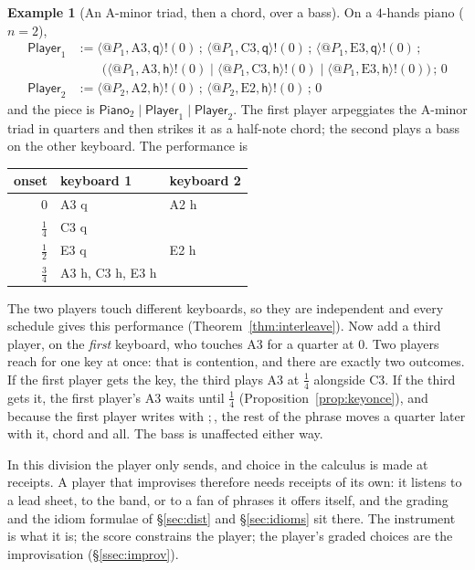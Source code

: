 \documentclass[11pt,a4paper]{article}
\theoremstyle{plain}
\theoremstyle{definition}
\newtheorem{example}[theorem]{Example}
\theoremstyle{remark}
\begin{document}
\begin{example}[An A-minor triad, then a chord, over a bass]\label{ex:piano}
On a $4$-hands piano ($n=2$),
\begin{align*}
\mathsf{Player}_1 &:= \langle @P_1,\mathrm{A3},\mathsf{q}\rangle!(0)\,;\,
  \langle @P_1,\mathrm{C3},\mathsf{q}\rangle!(0)\,;\,
  \langle @P_1,\mathrm{E3},\mathsf{q}\rangle!(0)\,; \\
 &\qquad \big(\langle @P_1,\mathrm{A3},\mathsf{h}\rangle!(0) \mid
  \langle @P_1,\mathrm{C3},\mathsf{h}\rangle!(0) \mid
  \langle @P_1,\mathrm{E3},\mathsf{h}\rangle!(0)\big)\,;\,0 \\
\mathsf{Player}_2 &:= \langle @P_2,\mathrm{A2},\mathsf{h}\rangle!(0)\,;\,
  \langle @P_2,\mathrm{E2},\mathsf{h}\rangle!(0)\,;\,0
\end{align*}
and the piece is $\mathsf{Piano}_2 \mid \mathsf{Player}_1 \mid \mathsf{Player}_2$.
The first player arpeggiates the A-minor triad in quarters and then strikes it
as a half-note chord; the second plays a bass on the other keyboard. The
performance is
\begin{center}
\small
\begin{tabular}{@{}rll@{}}
\toprule
onset & keyboard 1 & keyboard 2 \\
\midrule
$0$          & A3 q        & A2 h \\
$\tfrac14$   & C3 q        &      \\
$\tfrac12$   & E3 q        & E2 h \\
$\tfrac34$   & A3 h, C3 h, E3 h & \\
\bottomrule
\end{tabular}
\end{center}
The two players touch different keyboards, so they are independent and every
schedule gives this performance (Theorem~\ref{thm:interleave}). Now add a third
player, on the \emph{first} keyboard, who touches A3 for a quarter at $0$. Two
players reach for one key at once: that is contention, and there are exactly two
outcomes. If the first player gets the key, the third plays A3 at $\tfrac14$
alongside C3. If the third gets it, the first player's A3 waits until
$\tfrac14$ (Proposition~\ref{prop:keyonce}), and because the first player writes
with $;$, the rest of the phrase moves a quarter later with it, chord and all.
The bass is unaffected either way.
\end{example}

In this division the player only sends, and choice in the calculus is made at
receipts. A player that improvises therefore needs receipts of its own: it
listens to a lead sheet, to the band, or to a fan of phrases it offers itself,
and the grading and the idiom formulae of \S\ref{sec:dist} and
\S\ref{sec:idioms} sit there. The instrument is what it is; the score constrains
the player; the player's graded choices are the improvisation
(\S\ref{ssec:improv}).
\end{document}
